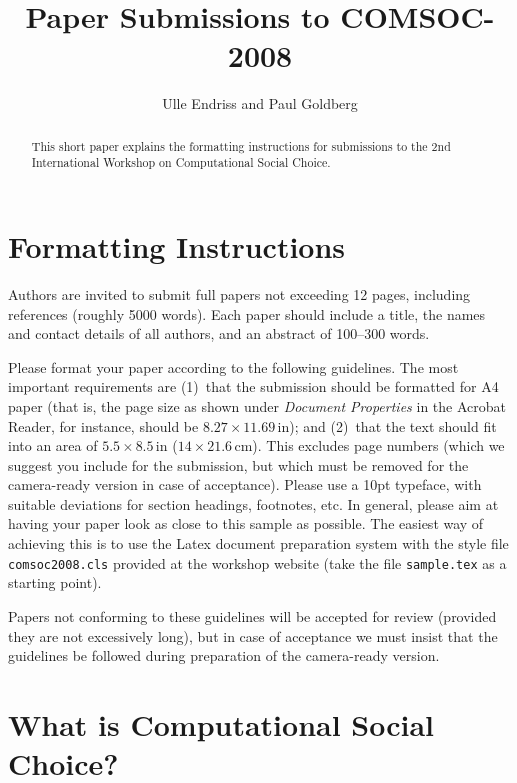 \documentclass{comsoc2008}
\title{Paper Submissions to COMSOC-2008}
\author{Ulle Endriss and Paul Goldberg}
\begin{document}

\begin{abstract}
This short paper explains the formatting instructions for submissions
to the 2nd International Workshop on Computational Social Choice.
\end{abstract}


\section{Formatting Instructions}

Authors are invited to submit full papers not exceeding 12 pages, 
including references (roughly 5000 words). Each paper should include 
a title, the names and contact details of all authors, and an abstract 
of 100--300 words.

Please format your paper according to the following guidelines.
The most important requirements are (1)~that the submission should be 
formatted for A4 paper (that is, the page size as shown under 
\emph{Document Properties} in the Acrobat Reader, for instance, should 
be $8.27\times 11.69\,\mbox{in}$); and (2)~that the text should fit into 
an area of $5.5\times 8.5\,\mbox{in}$ ($14\times 21.6\,\mbox{cm}$). 
This excludes page numbers (which we suggest you include for the 
submission, but which must be removed for the camera-ready version in 
case of acceptance). Please use a 10pt typeface, with suitable deviations
for section headings, footnotes, etc. In general, please aim at having 
your paper look as close to this sample as possible. The easiest way of 
achieving this is to use the Latex document preparation system with the 
style file \texttt{comsoc2008.cls} provided at the workshop  website 
(take the file \texttt{sample.tex} as a starting point).

Papers not conforming to these guidelines will be accepted for review
(provided they are not excessively long), but in case of acceptance we
must insist that the guidelines be followed during preparation of the 
camera-ready version.  


\section{What is Computational Social Choice?}
\end{document}
